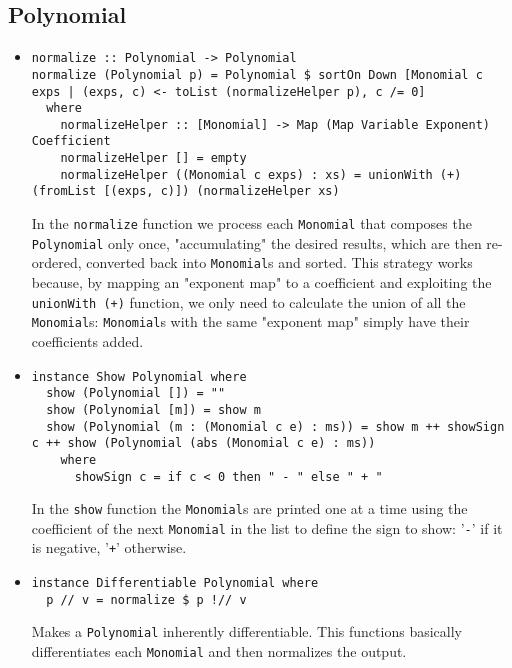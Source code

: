 \documentclass[11pt,a4paper]{article}
\begin{document}
\subsection{Polynomial}

\begin{itemize}
    \item \begin{lstlisting}
normalize :: Polynomial -> Polynomial
normalize (Polynomial p) = Polynomial $ sortOn Down [Monomial c exps | (exps, c) <- toList (normalizeHelper p), c /= 0]
  where
    normalizeHelper :: [Monomial] -> Map (Map Variable Exponent) Coefficient
    normalizeHelper [] = empty
    normalizeHelper ((Monomial c exps) : xs) = unionWith (+) (fromList [(exps, c)]) (normalizeHelper xs)
    \end{lstlisting}

          In the \lstinline{normalize} function we process each \lstinline{Monomial} that composes the \lstinline{Polynomial} only once, "accumulating" the desired results, which are then re-ordered, converted back into \lstinline{Monomial}s and sorted. This strategy works because, by mapping an "exponent map" to a coefficient and exploiting the \lstinline{unionWith (+)} function, we only need to calculate the union of all the \lstinline{Monomial}s: \lstinline{Monomial}s with the same "exponent map" simply have their coefficients added.

    \item \begin{lstlisting}
instance Show Polynomial where
  show (Polynomial []) = ""
  show (Polynomial [m]) = show m
  show (Polynomial (m : (Monomial c e) : ms)) = show m ++ showSign c ++ show (Polynomial (abs (Monomial c e) : ms))
    where
      showSign c = if c < 0 then " - " else " + "
    \end{lstlisting}

          In the \lstinline{show} function the \lstinline{Monomial}s are printed one at a time using the coefficient of the next \lstinline{Monomial} in the list to define the sign to show: '\lstinline{-}' if it is negative, '\lstinline{+}' otherwise.

    \item \begin{lstlisting}
instance Differentiable Polynomial where
  p // v = normalize $ p !// v
    \end{lstlisting}

          Makes a \lstinline{Polynomial} inherently differentiable. This functions basically differentiates each \lstinline{Monomial} and then normalizes the output.


\end{itemize}
\end{document}
